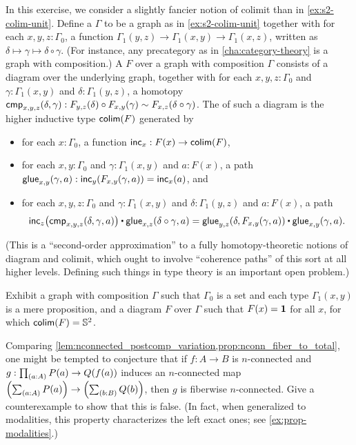 \begin{ex}\label{ex:s2-colim-unit-2}
  In this exercise, we consider a slightly fancier notion of colimit than in \cref{ex:s2-colim-unit}.
  Define a  $\Gamma$ to be a graph as in \cref{ex:s2-colim-unit} together with for each $x,y,z:\Gamma_0$, a function $\Gamma_1(y,z) \to \Gamma_1(x,y) \to \Gamma_1(x,z)$, written as $\delta\mapsto\gamma \mapsto \delta \circ \gamma$.
  (For instance, any precategory as in \cref{cha:category-theory} is a graph with composition.)
  A  $F$ over a graph with composition $\Gamma$ consists of a diagram over the underlying graph, together with for each $x,y,z:\Gamma_0$ and $\gamma:\Gamma_1(x,y)$ and $\delta:\Gamma_1(y,z)$, a homotopy $\mathsf{cmp}_{x,y,z}(\delta,\gamma) : F_{y,z}(\delta) \circ F_{x,y}(\gamma) \sim F_{x,z}(\delta\circ\gamma)$.
  The  of such a diagram is the higher inductive type $\mathsf{colim}(F)$ generated by
  \begin{itemize}
  \item for each $x:\Gamma_0$, a function $\mathsf{inc}_x:F(x) \to \mathsf{colim}(F)$,
  \item for each $x,y:\Gamma_0$ and $\gamma:\Gamma_1(x,y)$ and $a:F(x)$, a path $\mathsf{glue}_{x,y}(\gamma,a) : \mathsf{inc}_y(F_{x,y}(\gamma,a)) = \mathsf{inc}_x(a)$, and
  \item for each $x,y,z:\Gamma_0$ and $\gamma:\Gamma_1(x,y)$ and $\delta:\Gamma_1(y,z)$ and $a:F(x)$, a path
    \[ \ap{\inc_z}{\cmp_{x,y,z}(\delta,\gamma,a)} \ct \glue_{x,z}(\delta\circ \gamma,a) = \glue_{y,z}(\delta,F_{x,y}(\gamma,a)) \ct \glue_{x,y}(\gamma,a). \]
  \end{itemize}
  (This is a ``second-order approximation'' to a fully homotopy-theoretic notions of diagram and colimit, which ought to involve ``coherence paths'' of this sort at all higher levels.
  Defining such things in type theory is an important open problem.)

  Exhibit a graph with composition $\Gamma$ such that $\Gamma_0$ is a set and each type $\Gamma_1(x,y)$ is a mere proposition, and a diagram $F$ over $\Gamma$ such that $F(x)=\mathbf{1}$ for all $x$, for which $\mathsf{colim}(F)=\mathbb{S}^2$.
\end{ex}

\begin{ex}\label{ex:fiber-map-not-conn}
  Comparing \cref{lem:nconnected_postcomp_variation,prop:nconn_fiber_to_total}, one might be tempted to conjecture that if $f:A\to B$ is $n$-connected and $g:\prd{a:A} P(a) \to Q(f(a))$ induces an $n$-connected map $\Parens{\sm{a:A} P(a)} \to \Parens{\sm{b:B} Q(b)}$, then $g$ is fiberwise $n$-connected.
  Give a counterexample to show that this is false.
  (In fact, when generalized to modalities, this property characterizes the left exact ones; see \cref{ex:prop-modalities}.)
\end{ex}

